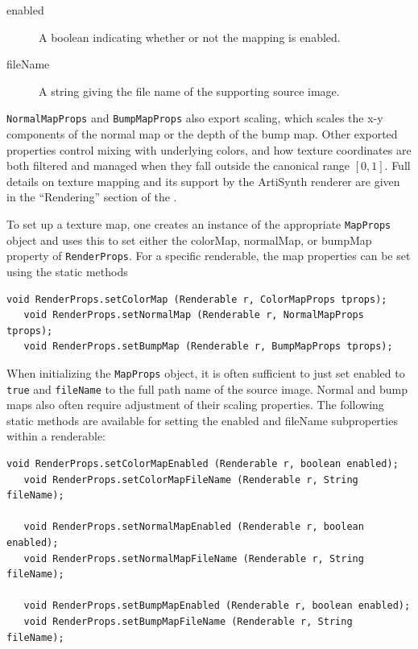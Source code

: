 \begin{description}

\item[enabled]\mbox{}

A boolean indicating whether or not the mapping is enabled.

\item[fileName]\mbox{}

A string giving the file name of the supporting source image.

\end{description}

{\tt NormalMapProps} and {\tt BumpMapProps} also export {\sf scaling},
which scales the x-y components of the normal map or the depth of the
bump map. Other exported properties control mixing with underlying
colors, and how texture coordinates are both filtered and managed when
they fall outside the canonical range $[0,1]$.  Full details on
texture mapping and its support by the ArtiSynth renderer are given in
the ``Rendering'' section of the 
.

To set up a texture map, one creates an instance of the appropriate
{\tt MapProps} object and uses this to set either the {\sf colorMap},
{\sf normalMap}, or {\sf bumpMap} property of {\tt RenderProps}.  
For a specific renderable, the map properties can be set
using the static methods
\begin{lstlisting}[]
   void RenderProps.setColorMap (Renderable r, ColorMapProps tprops);
   void RenderProps.setNormalMap (Renderable r, NormalMapProps tprops);
   void RenderProps.setBumpMap (Renderable r, BumpMapProps tprops);
\end{lstlisting}
%
When
initializing the {\tt MapProps} object, it is often sufficient to just
set {\sf enabled} to {\tt true} and {\tt fileName} to the full path
name of the source image.  Normal and bump maps also often require
adjustment of their {\sf scaling} properties.  The following static
methods are available for setting the {\sf enabled} and
{\sf fileName} subproperties within a renderable:
\begin{lstlisting}[]
   void RenderProps.setColorMapEnabled (Renderable r, boolean enabled);
   void RenderProps.setColorMapFileName (Renderable r, String fileName);

   void RenderProps.setNormalMapEnabled (Renderable r, boolean enabled);
   void RenderProps.setNormalMapFileName (Renderable r, String fileName);

   void RenderProps.setBumpMapEnabled (Renderable r, boolean enabled);
   void RenderProps.setBumpMapFileName (Renderable r, String fileName);
\end{lstlisting}
%

